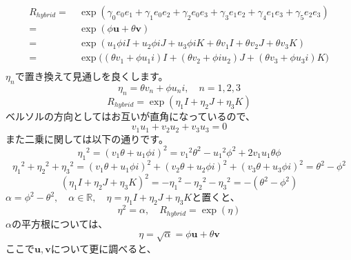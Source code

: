 \documentclass[a4paper,12pt,notitlepage]{jsreport}
\begin{document}
\begin{equation}
  \begin{split}
    R_{hybrid} = ~ & \exp(\gamma_0 e_0e_1 + \gamma_1 e_0e_2 + \gamma_2 e_0e_3
    + \gamma_3 e_1e_2 + \gamma_4 e_1e_3 + \gamma_5 e_2e_3) \\
    = ~ & \exp (\phi \bm{u} + \theta \bm{v}) \\
    = ~ & \exp (u_1 \phi iI + u_2 \phi iJ + u_3 \phi iK
    + \theta v_1 I + \theta v_2 J + \theta v_3 K) \\
    = ~ & \exp \Big( (\theta v_1 + \phi u_1 i)I + (\theta v_2 + \phi i u_2)J 
    + (\theta v_3 + \phi u_3 i)K \Big) \\
  \end{split}
\end{equation}
$ \eta_n $で置き換えて見通しを良くします。
\begin{equation}
  \eta_n = \theta v_n + \phi u_n i, \quad n = 1,2,3
\end{equation}
\begin{equation}
  R_{hybrid} = \exp (\eta_1 I + \eta_2 J + \eta_3 K)
\end{equation}
ベルソルの方向としてはお互いが直角になっているので、
\begin{equation}
  v_1 u_1 + v_2 u_2 + v_3 u_3 = 0
\end{equation}
また二乗に関しては以下の通りです。
\begin{equation}
  {\eta_1}^2 = (v_1 \theta + u_1 \phi i)^2 = {v_1}^2 \theta^2 - {u_1}^2 \phi^2 +2 v_1 u_1 \theta \phi
\end{equation}
\begin{equation}
  {\eta_1}^2 + {\eta_2}^2 + {\eta_3}^2
  = (v_1 \theta + u_1 \phi i)^2 + (v_2 \theta + u_2 \phi i)^2 + (v_3 \theta + u_3 \phi i)^2
  = \theta^2 - \phi^2
\end{equation}
\begin{equation}
  (\eta_1 I + \eta_2 J + \eta_3 K)^2 = - {\eta_1}^2 - {\eta_2}^2 - {\eta_3}^2
  = - (\theta^2 - \phi^2)
\end{equation}
$ \alpha = \phi^2 - \theta^2 , \quad \alpha \in \mathbb{R} 
, \quad \eta = \eta_1 I + \eta_2 J + \eta_3 K $と置くと、
\begin{equation}
  \eta^2 = \alpha
  , \quad R_{hybrid} = \exp (\eta)
\end{equation}
$ \alpha $の平方根については、
\begin{equation}
  \eta = \sqrt{\alpha} = \phi \bm{u} + \theta \bm{v}
\end{equation}
ここで$ \bm{u}, \bm{v} $について更に調べると、
\end{document}
